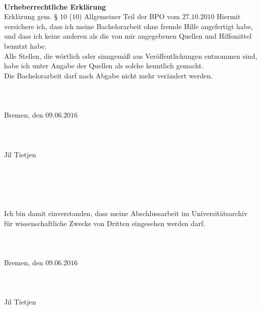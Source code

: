 \documentclass[a4,abstract=on]{scrartcl}
\begin{document}
	\newpage
~\\
\textbf{Urheberrechtliche Erklärung}\\
Erklärung gem. § $10$ ($10$) Allgemeiner Teil der BPO vom $27$.$10$.$2010$
Hiermit versichere ich, dass ich meine Bachelorarbeit ohne fremde Hilfe angefertigt habe, und dass ich keine anderen als die von mir angegebenen Quellen und Hilfsmittel benutzt habe.\\
Alle Stellen, die wörtlich oder sinngemäß aus Veröffentlichungen entnommen sind, habe ich unter Angabe der Quellen als solche kenntlich gemacht.\\
Die Bachelorarbeit darf nach Abgabe nicht mehr verändert werden.\\
~\\~\\~\\
Bremen, den $09$.$06$.$2016$\\
~\\~\\~\\
Jil Tietjen
~\\~\\~\\~\\~\\~\\
Ich bin damit einverstanden, dass meine Abschlussarbeit im Universitätsarchiv für wissenschaftliche Zwecke von Dritten eingesehen werden darf.\\
~\\~\\~\\
Bremen, den $09$.$06$.$2016$\\
~\\~\\~\\
Jil Tietjen
\clearpage

	\tableofcontents
	\clearpage
\end{document}
